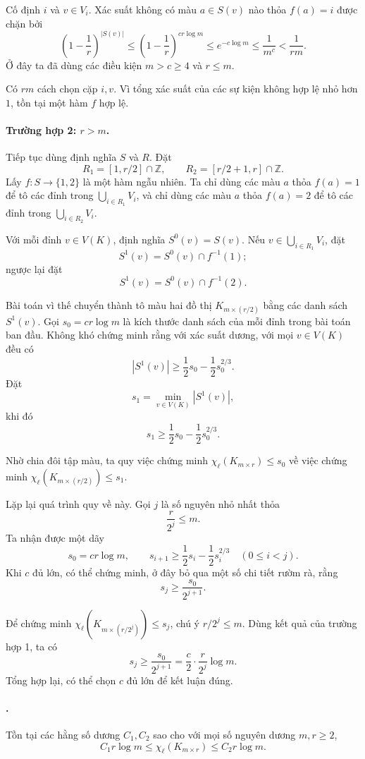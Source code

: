 \documentclass[11pt]{article}
\begin{document}
Cố định \(i\) và \(v\in V_i\). Xác suất không có màu \(a\in S(v)\) nào thỏa
\(f(a)=i\) được chặn bởi
\[
  \left(1-\frac1r\right)^{|S(v)|}
  \le \left(1-\frac1r\right)^{cr\log m}
  \le e^{-c\log m}\le \frac1{m^c}<\frac1{rm}.
\]
Ở đây ta đã dùng các điều kiện \(m>c\ge4\) và \(r\le m\).

Có \(rm\) cách chọn cặp \(i,v\). Vì tổng xác suất của các sự kiện không hợp lệ
nhỏ hơn \(1\), tồn tại một hàm \(f\) hợp lệ.

\paragraph{Trường hợp 2: \(r>m\).}
Tiếp tục dùng định nghĩa \(S\) và \(R\). Đặt
\[
  R_1=[1,r/2]\cap\mathbb Z,\qquad
  R_2=[r/2+1,r]\cap\mathbb Z.
\]
Lấy \(f:S\to\{1,2\}\) là một hàm ngẫu nhiên. Ta chỉ dùng các màu \(a\) thỏa
\(f(a)=1\) để tô các đỉnh trong \(\bigcup_{i\in R_1}V_i\), và chỉ dùng các màu
\(a\) thỏa \(f(a)=2\) để tô các đỉnh trong \(\bigcup_{i\in R_2}V_i\).

Với mỗi đỉnh \(v\in V(K)\), định nghĩa \(S^0(v)=S(v)\). Nếu
\(v\in\bigcup_{i\in R_1}V_i\), đặt
\[
  S^1(v)=S^0(v)\cap f^{-1}(1);
\]
ngược lại đặt
\[
  S^1(v)=S^0(v)\cap f^{-1}(2).
\]

Bài toán vì thế chuyển thành tô màu hai đồ thị \(K_{m\times(r/2)}\) bằng các
danh sách \(S^1(v)\). Gọi \(s_0=cr\log m\) là kích thước danh sách của mỗi đỉnh
trong bài toán ban đầu. Không khó chứng minh rằng với xác suất dương, với mọi
\(v\in V(K)\) đều có
\[
  |S^1(v)|\ge \frac12s_0-\frac12s_0^{2/3}.
\]
Đặt
\[
  s_1=\min_{v\in V(K)}|S^1(v)|,
\]
khi đó
\[
  s_1\ge \frac12s_0-\frac12s_0^{2/3}.
\]

Nhờ chia đôi tập màu, ta quy việc chứng minh
\(\chi_{\ell}(K_{m\times r})\le s_0\) về việc chứng minh
\(\chi_{\ell}(K_{m\times(r/2)})\le s_1\).

Lặp lại quá trình quy về này. Gọi \(j\) là số nguyên nhỏ nhất thỏa
\[
  \frac{r}{2^j}\le m.
\]
Ta nhận được một dãy
\[
  s_0=cr\log m,\qquad
  s_{i+1}\ge \frac12s_i-\frac12s_i^{2/3}\quad(0\le i<j).
\]
Khi \(c\) đủ lớn, có thể chứng minh, ở đây bỏ qua một số chi tiết rườm rà,
rằng
\[
  s_j\ge \frac{s_0}{2^{j+1}}.
\]

Để chứng minh \(\chi_{\ell}(K_{m\times(r/2^j)})\le s_j\), chú ý
\(r/2^j\le m\). Dùng kết quả của trường hợp 1, ta có
\[
  s_j\ge \frac{s_0}{2^{j+1}}
      = \frac c2\cdot \frac r{2^j}\log m.
\]
Tổng hợp lại, có thể chọn \(c\) đủ lớn để kết luận đúng.

\paragraph{.}
Tồn tại các hằng số dương \(C_1,C_2\) sao cho với mọi số nguyên dương
\(m,r\ge2\),
\[
  C_1r\log m\le \chi_{\ell}(K_{m\times r})\le C_2r\log m.
\]
\end{document}
